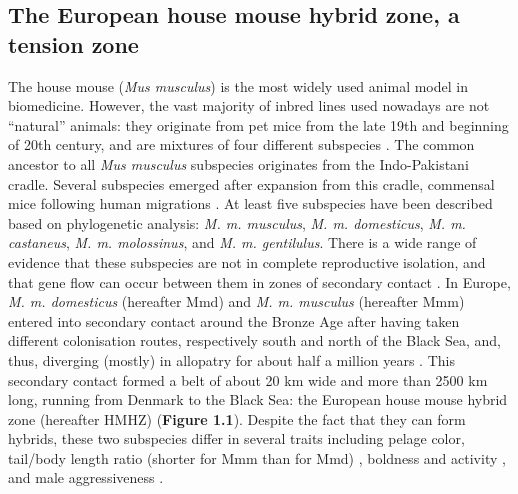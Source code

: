 \subsection{The European house mouse hybrid zone, a tension zone}
The house mouse (\textit{Mus musculus}) is the most widely used animal model in biomedicine. However, the vast majority of inbred lines used nowadays are not “natural” animals: they originate from pet mice from the late 19th and beginning of 20th century, and are mixtures of four different subspecies \citep{davisson_chapter_2004}. The common ancestor to all \textit{Mus musculus} subspecies originates from the Indo-Pakistani cradle. Several subspecies emerged after expansion from this cradle, commensal mice following human migrations \citep{boursot_evolution_1993}. At least five subspecies have been described based on phylogenetic analysis: \textit{M. m. musculus}, \textit{M. m. domesticus}, \textit{M. m. castaneus}, \textit{M. m. molossinus}, and \textit{M. m. gentilulus}. There is a wide range of evidence that these subspecies are not in complete reproductive isolation, and that gene flow can occur between them in zones of secondary contact \citep{auffray_house_2012}. In Europe, \textit{M. m. domesticus} (hereafter Mmd) and \textit{M. m. musculus} (hereafter Mmm) entered into secondary contact around the Bronze Age after having taken different colonisation routes, respectively south and north of the Black Sea, and, thus, diverging (mostly) in allopatry for about half a million years \citep{duvaux_isolation_2011, geraldes_inferring_2008, geraldes_higher_2011}. This secondary contact formed a belt of about 20 km wide and more than 2500 km long, running from Denmark to the Black Sea: the European house mouse hybrid zone (hereafter HMHZ) \citep{baird_what_2012, boursot_evolution_1993}(\textbf{Figure 1.1}). Despite the fact that they can form hybrids, these two subspecies differ in several traits including pelage color, tail/body length ratio (shorter for Mmm than for Mmd) \citep{boursot_evolution_1993}, boldness and activity \citep{frynta_behavioural_2018}, and male aggressiveness \citep{dureje_no_2010}.

